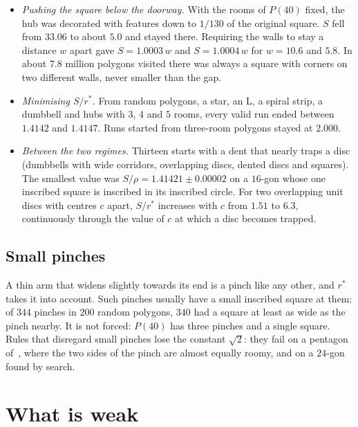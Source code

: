 \documentclass[11pt,a4paper]{article}
\theoremstyle{definition}\newtheorem{definition}{Definition}
\theoremstyle{remark}\newtheorem{remark}{Remark}
\begin{document}
\begin{itemize}
\item \emph{Pushing the square below the doorway.} With the rooms of $P(40)$
fixed, the hub was decorated with features down to $1/130$ of the original
square. $S$ fell from $33.06$ to about $5.0$ and stayed there. Requiring the
walls to stay a distance $w$ apart gave $S=1.0003\,w$ and $S=1.0004\,w$ for
$w=10.6$ and $5.8$. In about $7.8$ million polygons visited there was always a
square with corners on two different walls, never smaller than the gap.
\item \emph{Minimising $S/r^*$.} From random polygons, a star, an L, a spiral
strip, a dumbbell and hubs with $3$, $4$ and $5$ rooms, every valid run
ended between $1.4142$ and $1.4147$. Runs started from three-room polygons
stayed at $2.000$.
\item \emph{Between the two regimes.} Thirteen starts with a dent that nearly
traps a disc (dumbbells with wide corridors, overlapping discs, dented discs and
squares). The smallest value was $S/\rho=1.41421\pm0.00002$ on a $16$-gon whose
one inscribed square is inscribed in its inscribed circle. For two overlapping
unit discs with centres $c$ apart, $S/r^*$ increases with $c$ from $1.51$ to
$6.3$, continuously through the value of $c$ at which a disc becomes trapped.
\end{itemize}

\subsection*{Small pinches}

A thin arm that widens slightly towards its end is a pinch like any other, and
$r^*$ takes it into account. Such pinches usually have a small inscribed square
at them: of $344$ pinches in $200$ random polygons, $340$ had a square at least
as wide as the pinch nearby. It is not forced: $P(40)$ has three pinches and a
single square. Rules that disregard small pinches lose the constant $\sqrt2$:
they fail on a pentagon of~\cite{ss}, where the two sides of the pinch are
almost equally roomy, and on a $24$-gon found by search.

\section{What is weak}\label{sec:weak}
\end{document}
